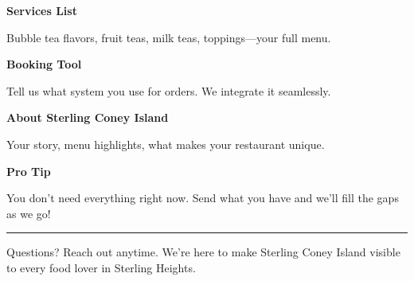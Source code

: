 \documentclass[11pt,letterpaper]{article}
\begin{document}
\begin{minipage}[t]{0.48\textwidth}
\begin{tcolorbox}[colframe=accent-teal, boxrule=1pt, left=0.7em, right=0.7em, top=0.5em, bottom=0.5em, arc=4pt, boxsep=0pt]
{\bfseries\small\color{accent-teal}Services List}

\vspace{0.15em}

{\small Bubble tea flavors, fruit teas, milk teas, toppings---your full menu.}
\end{tcolorbox}

\vspace{0.1em}

\begin{tcolorbox}[colframe=accent-teal, boxrule=1pt, left=0.7em, right=0.7em, top=0.5em, bottom=0.5em, arc=4pt, boxsep=0pt]
{\bfseries\small\color{accent-teal}Booking Tool}

\vspace{0.15em}

{\small Tell us what system you use for orders. We integrate it seamlessly.}
\end{tcolorbox}

\vspace{0.1em}

\begin{tcolorbox}[colframe=accent-teal, boxrule=1pt, left=0.7em, right=0.7em, top=0.5em, bottom=0.5em, arc=4pt, boxsep=0pt]
{\bfseries\small\color{accent-teal}About Sterling Coney Island}

\vspace{0.15em}

{\small Your story, menu highlights, what makes your restaurant unique.}
\end{tcolorbox}

\vspace{-0.2em}
\end{minipage}

\vspace{0.15em}

\begin{tcolorbox}[colback={accent-red!5}, colframe=accent-red!20, boxrule=0.5pt, left=0.7em, right=0.7em, top=0.4em, bottom=0.4em, arc=6pt, boxsep=0pt]

{\bfseries\small\color{accent-red}Pro Tip}

\vspace{0.1em}

{\small You don't need everything right now. Send what you have and we'll fill the gaps as we go!}

\end{tcolorbox}

\vspace{0.15em}

\noindent\hrule
\vspace{0.2em}

{\small\color{text-light}Questions? Reach out anytime. We're here to make Sterling Coney Island visible to every food lover in Sterling Heights.}
\end{document}
